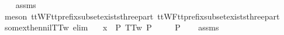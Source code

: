 \begin{isabellebody}
%
\isadelimproof
\ \ %
\endisadelimproof
%
\isatagproof
{}\isamarkupfalse%
\ assms\isanewline
\ \ \isamarkupfalse%
\ {\isacharparenleft}meson\ ttWF{\isacharunderscore}tt{\isacharunderscore}prefix{\isacharunderscore}subset{\isacharunderscore}exists{\isacharunderscore}three{\isacharunderscore}part\ ttWF{\isacharunderscore}tt{\isacharunderscore}prefix{\isacharunderscore}subset{\isacharunderscore}exists{\isacharunderscore}three{\isacharunderscore}part{\isacharprime}{\isacharparenright}%
\endisatagproof
{\isafoldproof}%
%
\isadelimproof
%
\endisadelimproof
%
\isadelimdocument
%
\endisadelimdocument
%
\isatagdocument
%
\isamarkuptrue%
%
\endisatagdocument
{\isafolddocument}%
%
\isadelimdocument
%
\endisadelimdocument
%
%
\isamarkupfalse%
\ some{\isacharunderscore}x{\isacharunderscore}then{\isacharunderscore}nil{\isacharunderscore}TT{}w\ {\isacharbrackleft}elim{\isacharbrackright}{\isacharcolon}\isanewline
\ \ \ {\isachardoublequoteopen}x\ {\isasymin}\ P{\isachardoublequoteclose}\ {\isachardoublequoteopen}TT{}w\ P{\isachardoublequoteclose}\isanewline
\ \ \ {\isachardoublequoteopen}{\isacharbrackleft}{\isacharbrackright}\ {\isasymin}\ P{\isachardoublequoteclose}\isanewline
%
\isadelimproof
\ \ %
\endisadelimproof
%
\isatagproof
{}\isamarkupfalse%
\ assms\ \isanewline
\ \ \isamarkupfalse%

\end{isabellebody}
